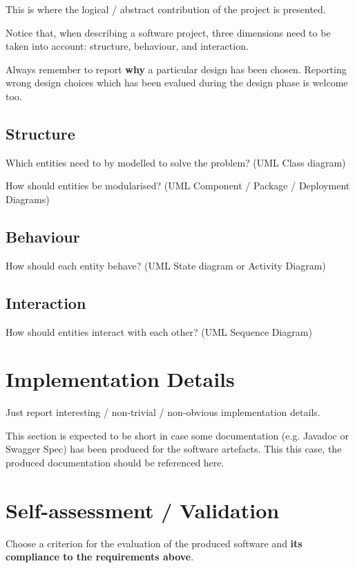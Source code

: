 \documentclass{scrartcl}
\begin{document}
    This is where the logical / abstract contribution of the project is presented.

    Notice that, when describing a software project, three dimensions need to be taken into account: structure, behaviour, and interaction.

    Always remember to report \textbf{why} a particular design has been chosen.
    Reporting wrong design choices which has been evalued during the design phase is welcome too.

    \subsection{Structure}

    Which entities need to by modelled to solve the problem?
%
    (UML Class diagram)

    How should entities be modularised?
%
    (UML Component / Package / Deployment Diagrams)

    \subsection{Behaviour}

    How should each entity behave?
%
    (UML State diagram or Activity Diagram)

    \subsection{Interaction}

    How should entities interact with each other?
%
    (UML Sequence Diagram)


    \section{Implementation Details}

    Just report interesting / non-trivial / non-obvious implementation details.

    This section is expected to be short in case some documentation (e.g. Javadoc or Swagger Spec) has been produced for the software artefacts.
%
    This this case, the produced documentation should be referenced here.


    \section{Self-assessment / Validation}

    Choose a criterion for the evaluation of the produced software and \textbf{its compliance to the requirements above}.
\end{document}
